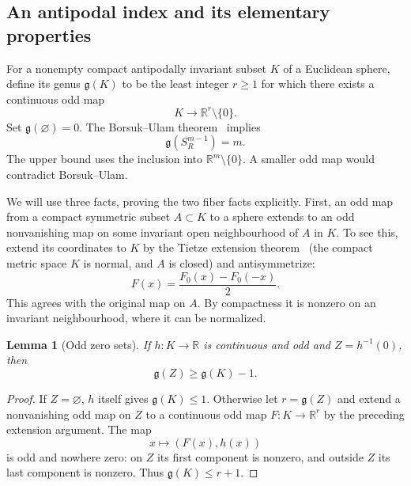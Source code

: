 \documentclass[11pt,a4paper]{article}
\newtheorem{lemma}[theorem]{Lemma}
\theoremstyle{remark}
\newcommand{\R}{\mathbb R}
\newcommand{\gen}{\mathfrak g}
\begin{document}
\subsection{An antipodal index and its elementary properties}

For a nonempty compact antipodally invariant subset $K$ of a Euclidean sphere, define its genus $\gen(K)$ to be the least integer $r\ge1$ for which there exists a continuous odd map
\[
 K\longrightarrow\R^r\setminus\{0\}.
\]
Set $\gen(\varnothing)=0$. The Borsuk--Ulam theorem~\cite{matousek} implies
\begin{equation}\label{eq:gensphere}
 \gen(S_R^{m-1})=m.
\end{equation}
The upper bound uses the inclusion into $\R^m\setminus\{0\}$. A smaller odd map would contradict Borsuk--Ulam.

We will use three facts, proving the two fiber facts explicitly. First, an odd map from a compact symmetric subset $A\subset K$ to a sphere extends to an odd nonvanishing map on some invariant open neighbourhood of $A$ in $K$. To see this, extend its coordinates to $K$ by the Tietze extension theorem~\cite{munkres} (the compact metric space $K$ is normal, and $A$ is closed) and antisymmetrize:
\[
 F(x)=\frac{F_0(x)-F_0(-x)}2.
\]
This agrees with the original map on $A$. By compactness it is nonzero on an invariant neighbourhood, where it can be normalized.

\begin{lemma}[Odd zero sets]\label{lem:oddzero}
If $h:K\to\R$ is continuous and odd and $Z=h^{-1}(0)$, then
\[
 \gen(Z)\ge\gen(K)-1.
\]
\end{lemma}
\begin{proof}
If $Z=\varnothing$, $h$ itself gives $\gen(K)\le1$. Otherwise let $r=\gen(Z)$ and extend a nonvanishing odd map on $Z$ to a continuous odd map $F:K\to\R^r$ by the preceding extension argument. The map
\[
 x\longmapsto(F(x),h(x))
\]
is odd and nowhere zero: on $Z$ its first component is nonzero, and outside $Z$ its last component is nonzero. Thus $\gen(K)\le r+1$.
\end{proof}
\end{document}
